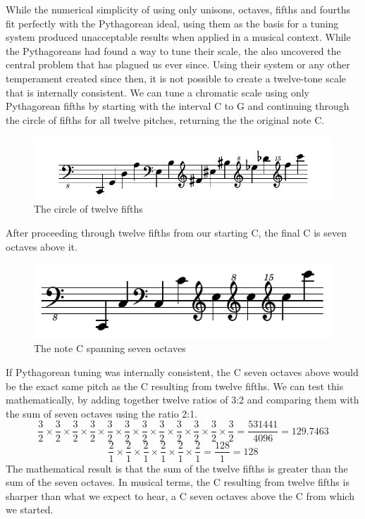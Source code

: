 While the numerical simplicity of using only unisons, octaves, fifths and fourths fit
perfectly with the Pythagorean ideal, using them as the basis for a tuning system produced
unacceptable results when applied in a musical context.  While the Pythagoreans had found
a way to tune their scale, the also uncovered the central problem that has plagued us ever
since.  Using their system or any other temperament created since then, it is not possible
to create a twelve-tone scale that is internally consistent.  We can tune a chromatic
scale using only Pythagorean fifths by starting with the interval C to G and continuing
through the circle of fifths for all twelve pitches, returning the the original note C.
\begin{figure}[h]
\centering
\includegraphics{examples/12-fifths.pdf}
\caption{The circle of twelve fifths}
\end{figure}
After proceeding through twelve fifths from our starting C, the final C is seven octaves
above it.
\begin{figure}[h]
\centering
\includegraphics{examples/7-octaves.pdf}
\caption{The note C spanning seven octaves}
\end{figure}
If Pythagorean tuning was internally consistent, the C seven octaves above would be the
exact same pitch as the C resulting from twelve fifths.  We can test this mathematically,
by adding together twelve ratios of 3:2 and comparing them with the sum of seven octaves
using the ratio 2:1.\autocite[25]{RD:1}
\begin{equation}
    \frac{3}{2} \times
    \frac{3}{2} \times
    \frac{3}{2} \times
    \frac{3}{2} \times
    \frac{3}{2} \times
    \frac{3}{2} \times
    \frac{3}{2} \times
    \frac{3}{2} \times
    \frac{3}{2} \times
    \frac{3}{2} \times
    \frac{3}{2} \times
    \frac{3}{2} = \frac{531441}{4096} = 129.7463
\end{equation}
\begin{equation}
    \frac{2}{1} \times
    \frac{2}{1} \times
    \frac{2}{1} \times
    \frac{2}{1} \times
    \frac{2}{1} \times
    \frac{2}{1} = \frac{128}{1} = 128
\end{equation}
The mathematical result is that the sum of the twelve fifths is greater than the sum of
the seven octaves.  In musical terms, the C resulting from twelve fifths is sharper than
what we expect to hear, a C seven octaves above the C from which we started.

